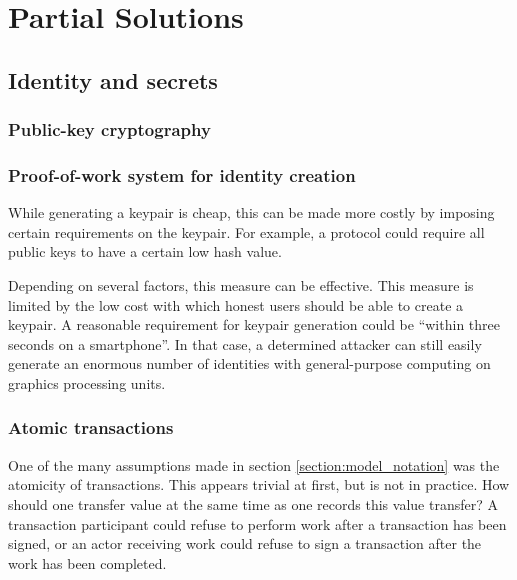 \chapter{Partial Solutions}
\section{Identity and secrets}
\subsection{Public-key cryptography}

\subsection{Proof-of-work system for identity creation}\label{sssection:chain_creation_cost}
While generating a keypair is cheap, this can be made more costly by imposing certain requirements on the keypair. For example, a protocol could require all public keys to have a certain low hash value.

Depending on several factors, this measure can be effective. This measure is limited by the low cost with which honest users should be able to create a keypair. A reasonable requirement for keypair generation could be ``within three seconds on a smartphone''. In that case, a determined attacker can still easily generate an enormous number of identities with general-purpose computing on graphics processing units.

\subsection{Atomic transactions}
One of the many assumptions made in section \ref{section:model_notation} was the atomicity of transactions. 
This appears trivial at first, but is not in practice. 
How should one transfer value at the same time as one records this value transfer? 
A transaction participant could refuse to perform work after a transaction has been signed, 
or an actor receiving work could refuse to sign a transaction after the work has been completed.

